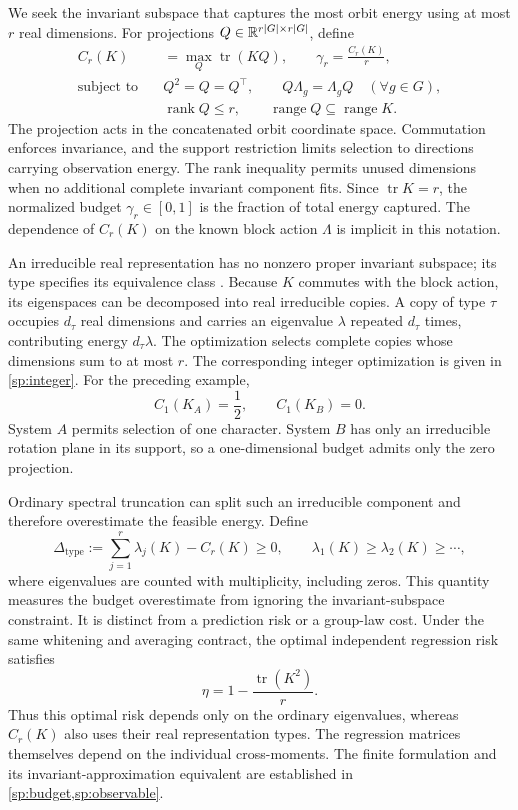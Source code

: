 We seek the invariant subspace that captures the most
orbit energy using at most $r$ real dimensions.
For projections
$Q\in\mathbb{R}^{r|G|\times r|G|}$, define
\begin{equation}
 \begin{aligned}
 C_r(K)
 &=
 \max_Q\operatorname{tr}(KQ),
 \qquad
 \gamma_r=\frac{C_r(K)}{r},\\
 \text{subject to}\quad
 &Q^2=Q=Q^\top,\qquad
   Q\Lambda_g=\Lambda_gQ\quad(\forall g\in G),\\
 &\operatorname{rank}Q\le r,\qquad
   \operatorname{range}Q\subseteq\operatorname{range}K.
 \end{aligned}
 \label{eq:budget-main}
\end{equation}
The projection acts in the concatenated orbit coordinate
space.
Commutation enforces invariance, and the support restriction
limits selection to directions carrying observation energy.
The rank inequality permits unused dimensions when no
additional complete invariant component fits.
Since $\operatorname{tr}K=r$, the normalized budget
$\gamma_r\in[0,1]$ is the fraction of total energy captured.
The dependence of $C_r(K)$ on the known block action
$\Lambda$ is implicit in this notation.

An irreducible real representation has no nonzero proper
invariant subspace; its type specifies its equivalence
class \citep{serre1977linear}.
Because $K$ commutes with the block action, its eigenspaces
can be decomposed into real irreducible copies.
A copy of type $\tau$ occupies $d_\tau$ real dimensions
and carries an eigenvalue $\lambda$ repeated $d_\tau$
times, contributing energy $d_\tau\lambda$.
The optimization selects complete copies whose dimensions
sum to at most $r$.
The corresponding integer optimization is given in
\cref{sp:integer}.
For the preceding example,
\[
 C_1(K_A)=\frac12,
 \qquad
 C_1(K_B)=0.
\]
System $A$ permits selection of one character.
System $B$ has only an irreducible rotation plane in its
support, so a one-dimensional budget admits only the
zero projection.

Ordinary spectral truncation can split such an irreducible
component and therefore overestimate the feasible energy.
Define
\[
 \Delta_{\mathrm{type}}
 :=
 \sum_{j=1}^{r}\lambda_j(K)-C_r(K)
 \ge0,
 \qquad
 \lambda_1(K)\ge\lambda_2(K)\ge\cdots,
\]
where eigenvalues are counted with multiplicity, including
zeros.
This quantity measures the budget overestimate from
ignoring the invariant-subspace constraint.
It is distinct from a prediction risk or a group-law cost.
Under the same whitening and averaging contract, the
optimal independent regression risk satisfies
\[
 \eta=1-\frac{\operatorname{tr}(K^2)}{r}.
\]
Thus this optimal risk depends only on the ordinary
eigenvalues, whereas $C_r(K)$ also uses their real
representation types.
The regression matrices themselves depend on the
individual cross-moments.
The finite formulation and its invariant-approximation
equivalent are established in
\cref{sp:budget,sp:observable}.

